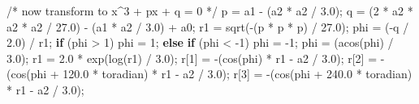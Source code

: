 \documentclass[
  letterpaper,
  DIV=11,
  numbers=noendperiod]{scrartcl}
\newenvironment{Shaded}{\begin{snugshade}}{\end{snugshade}}
\newcommand{\CommentTok}[1]{\textcolor[rgb]{0.37,0.37,0.37}{#1}}
\newcommand{\ControlFlowTok}[1]{\textcolor[rgb]{0.00,0.23,0.31}{\textbf{#1}}}
\newcommand{\DecValTok}[1]{\textcolor[rgb]{0.68,0.00,0.00}{#1}}
\newcommand{\FloatTok}[1]{\textcolor[rgb]{0.68,0.00,0.00}{#1}}
\newcommand{\NormalTok}[1]{\textcolor[rgb]{0.00,0.23,0.31}{#1}}
\newcommand{\OperatorTok}[1]{\textcolor[rgb]{0.37,0.37,0.37}{#1}}
\begin{document}
\begin{Shaded}
\begin{Highlighting}[]
        \CommentTok{/* now transform to x\^{}3 + px + q = 0 */}
\NormalTok{        p }\OperatorTok{=}\NormalTok{ a1 }\OperatorTok{{-}} \OperatorTok{(}\NormalTok{a2 }\OperatorTok{*}\NormalTok{ a2 }\OperatorTok{/} \FloatTok{3.0}\OperatorTok{);}
\NormalTok{        q }\OperatorTok{=} \OperatorTok{(}\DecValTok{2} \OperatorTok{*}\NormalTok{ a2 }\OperatorTok{*}\NormalTok{ a2 }\OperatorTok{*}\NormalTok{ a2 }\OperatorTok{/} \FloatTok{27.0}\OperatorTok{)} \OperatorTok{{-}} \OperatorTok{(}\NormalTok{a1 }\OperatorTok{*}\NormalTok{ a2 }\OperatorTok{/} \FloatTok{3.0}\OperatorTok{)} \OperatorTok{+}\NormalTok{ a0}\OperatorTok{;}
\NormalTok{        r1 }\OperatorTok{=}\NormalTok{ sqrt}\OperatorTok{({-}(}\NormalTok{p }\OperatorTok{*}\NormalTok{ p }\OperatorTok{*}\NormalTok{ p}\OperatorTok{)} \OperatorTok{/} \FloatTok{27.0}\OperatorTok{);}
\NormalTok{        phi }\OperatorTok{=} \OperatorTok{({-}}\NormalTok{q }\OperatorTok{/} \FloatTok{2.0}\OperatorTok{)} \OperatorTok{/}\NormalTok{ r1}\OperatorTok{;}
        \ControlFlowTok{if} \OperatorTok{(}\NormalTok{phi }\OperatorTok{\textgreater{}} \DecValTok{1}\OperatorTok{)}
\NormalTok{            phi }\OperatorTok{=} \DecValTok{1}\OperatorTok{;}
        \ControlFlowTok{else} \ControlFlowTok{if} \OperatorTok{(}\NormalTok{phi }\OperatorTok{\textless{}} \OperatorTok{{-}}\DecValTok{1}\OperatorTok{)}
\NormalTok{            phi }\OperatorTok{=} \OperatorTok{{-}}\DecValTok{1}\OperatorTok{;}
\NormalTok{        phi }\OperatorTok{=} \OperatorTok{(}\NormalTok{acos}\OperatorTok{(}\NormalTok{phi}\OperatorTok{)} \OperatorTok{/} \FloatTok{3.0}\OperatorTok{);}
\NormalTok{        r1 }\OperatorTok{=} \FloatTok{2.0} \OperatorTok{*}\NormalTok{ exp}\OperatorTok{(}\NormalTok{log}\OperatorTok{(}\NormalTok{r1}\OperatorTok{)} \OperatorTok{/} \FloatTok{3.0}\OperatorTok{);}
\NormalTok{        r}\OperatorTok{[}\DecValTok{1}\OperatorTok{]} \OperatorTok{=} \OperatorTok{{-}(}\NormalTok{cos}\OperatorTok{(}\NormalTok{phi}\OperatorTok{)} \OperatorTok{*}\NormalTok{ r1 }\OperatorTok{{-}}\NormalTok{ a2 }\OperatorTok{/} \FloatTok{3.0}\OperatorTok{);}
\NormalTok{        r}\OperatorTok{[}\DecValTok{2}\OperatorTok{]} \OperatorTok{=} \OperatorTok{{-}(}\NormalTok{cos}\OperatorTok{(}\NormalTok{phi }\OperatorTok{+} \FloatTok{120.0} \OperatorTok{*}\NormalTok{ toradian}\OperatorTok{)} \OperatorTok{*}\NormalTok{ r1 }\OperatorTok{{-}}\NormalTok{ a2 }\OperatorTok{/} \FloatTok{3.0}\OperatorTok{);}
\NormalTok{        r}\OperatorTok{[}\DecValTok{3}\OperatorTok{]} \OperatorTok{=} \OperatorTok{{-}(}\NormalTok{cos}\OperatorTok{(}\NormalTok{phi }\OperatorTok{+} \FloatTok{240.0} \OperatorTok{*}\NormalTok{ toradian}\OperatorTok{)} \OperatorTok{*}\NormalTok{ r1 }\OperatorTok{{-}}\NormalTok{ a2 }\OperatorTok{/} \FloatTok{3.0}\OperatorTok{);}

\end{Highlighting}
\end{Shaded}
\end{document}
